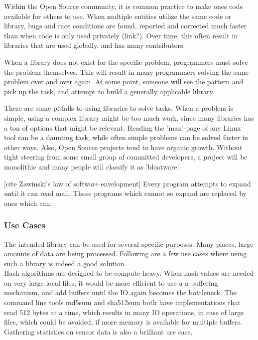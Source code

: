\documentclass[a4paper]{article}
\begin{document}
Within the Open Source community, it is common practice to make ones code available for others to use.
When multiple entities utilize the same code or library, bugs and race conditions are found, reported and corrected
much faster than when code is only used privately (link?). Over time, this often result in libraries that are
used globally, and has many contributors.

When a library does not exist for the specific problem, programmers must solve the problem themselves. This will
result in many programmers solving the same problem over and over again. At some point, someone will see the pattern
and pick up the task, and attempt to build a generally applicable library.

There are some pitfalls to using libraries to solve tasks. When a problem is simple, using a complex library might
be too much work, since many libraries has a ton of options that might be relevant. Reading the 'man'-page of any
Linux tool can be a daunting task, while often simple problems can be solved faster in other ways. Also, Open Source
projects tend to have organic growth. Without tight steering from some small group of committed developers, a project
will be monolithic and many people will classify it as 'bloatware'.

[cite Zawinski's law of software envelopment]
    Every program attempts to expand until it can read mail. Those programs which cannot so expand are replaced by ones which can.


\subsubsection{Use Cases}
The intended library can be used for several specific purposes. Many places, large amounts of data are being processed.
Following are a few use cases where using such a library is indeed a good solution.\\


Hash algorithms are designed to be compute-heavy. When hash-values are needed on very large local files, it would
be more efficient to use a n-buffering mechanism, and add buffers until the IO again becomes the bottleneck. The
command line tools md5sum and sha512sum both have implementations that read 512 bytes at a time, which results in
many IO operations, in case of large files, which could be avoided, if more memory is available for multiple buffers. Gathering statistics
on sensor data is also a brilliant use case.\\
\end{document}
